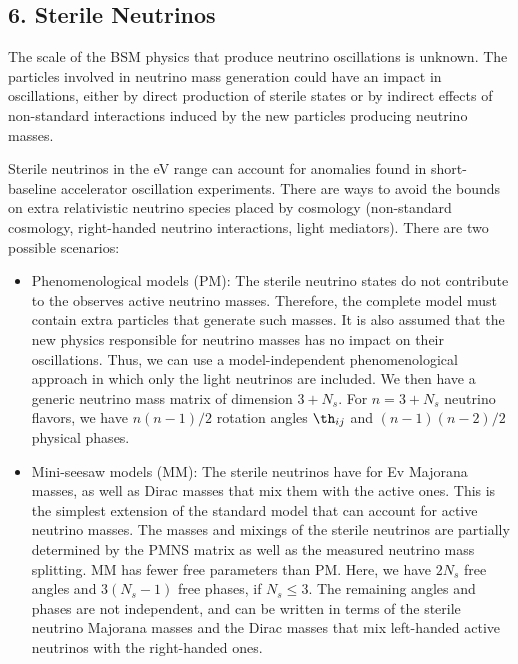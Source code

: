 \documentclass[twocolumn]{article}
\begin{document}
\subsection*{6. Sterile Neutrinos}
The scale of the BSM physics that produce neutrino oscillations is unknown. The particles involved in neutrino mass generation could have an impact in oscillations, either by direct production of sterile states or by indirect effects of non-standard interactions induced by the new particles producing neutrino masses. 

Sterile neutrinos in the eV range can account for anomalies found in short-baseline accelerator oscillation experiments. There are ways to avoid the bounds on extra relativistic neutrino species placed by cosmology (non-standard cosmology, right-handed neutrino interactions, light mediators). 
There are two possible scenarios:
\begin{itemize}
  \item Phenomenological models (PM): The sterile neutrino states do not contribute to the observes active neutrino masses. Therefore, the complete model must contain extra particles that generate such masses. It is also assumed that the new physics responsible for neutrino masses has no impact on their oscillations. Thus, we can use a model-independent phenomenological approach in which only the light neutrinos are included. We then have  a generic neutrino mass matrix of dimension $3+N_s$. For $n = 3+N_s$ neutrino flavors, we have $n(n-1)/2$ rotation angles $\th_{ij}$ and $(n-1)(n-2)/2$ physical phases.
  \item Mini-seesaw models (MM): The sterile neutrinos have for Ev Majorana masses, as well as Dirac masses that mix them with the active ones. This is the simplest extension of the standard model that can account for active neutrino masses. The masses and mixings of the sterile neutrinos are partially determined by the PMNS matrix as well as the measured neutrino mass splitting. MM has fewer free parameters than PM. Here, we have $2N_s$ free angles and $3(N_s-1)$ free phases, if $N_s \le 3$. The remaining angles and phases are not independent, and can be written in terms of the sterile neutrino Majorana masses and the Dirac masses that mix left-handed active neutrinos with the right-handed ones.
\end{itemize}
\end{document}
